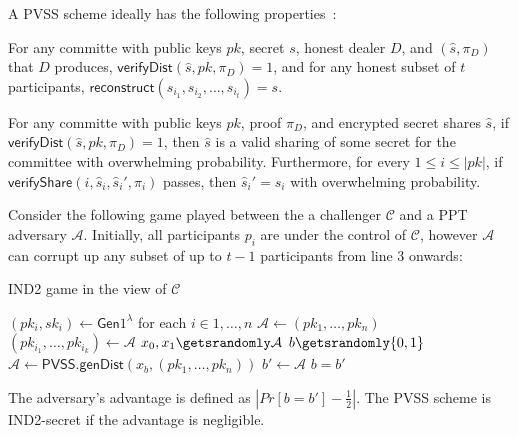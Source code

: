 A PVSS scheme ideally has the following properties~\cite{pvss_pairings_heidervand}:
\begin{definition}[Correctness]
    For any committe with public keys $pk$, secret $s$, honest dealer $D$, and $(\hat{s}, \pi_D)$ that $D$ produces, $\textsf{verifyDist}(\hat{s}, pk, \pi_D) = 1$, and for any honest subset of $t$ participants, $\textsf{reconstruct}(s_{i_1}, s_{i_2}, \dots, s_{i_t}) = s$.
\end{definition}
\begin{definition}[Verifiability]
    For any committe with public keys $pk$, proof $\pi_D$, and encrypted secret shares $\hat{s}$, if $\textsf{verifyDist}(\hat{s}, pk, \pi_D) = 1$, then $\hat{s}$ is a valid sharing of some secret for the committee with overwhelming probability.
    Furthermore, for every $1 \leq i \leq |pk|$, if $\textsf{verifyShare}(i, \hat{s}_i, \hat{s}_i', \pi_i)$ passes, then $\hat{s}_i' = s_i$ with overwhelming probability.
\end{definition}
\begin{definition}
    Consider the following game played between the a challenger $\mathcal{C}$ and a PPT adversary $\mathcal{A}$.
    Initially, all participants $p_i$ are under the control of $\mathcal{C}$, however $\mathcal{A}$ can corrupt up any subset of up to $t-1$ participants from line 3 onwards:
    \begin{algorithm}[H]
    \caption{IND2 game in the view of $\mathcal{C}$}
        \begin{algorithmic}[1]
            \State $(pk_i, sk_i) \gets \textsf{Gen}{1^{\lambda}}$ for each $i \in 1, \dots, n$
            \State $\mathcal{A} \gets (pk_1, \dots, pk_n)$
            \State $(pk_{i_1}, \dots, pk_{i_k}) \gets \mathcal{A}$
            \State $x_0, x_1 \getsrandomly \mathcal{A}$
            \State $b \getsrandomly \{0, 1\}$
            \State $\mathcal{A} \gets \textsf{PVSS.genDist}(x_b, (pk_1, \dots, pk_n))$
            \State $b' \gets \mathcal{A}$
            \State \Return $b = b'$
        \end{algorithmic}
    \end{algorithm}
    The adversary's advantage is defined as $|Pr[b = b'] - \frac{1}{2}|$.
    The PVSS scheme is IND2-secret if the advantage is negligible.
\end{definition}

